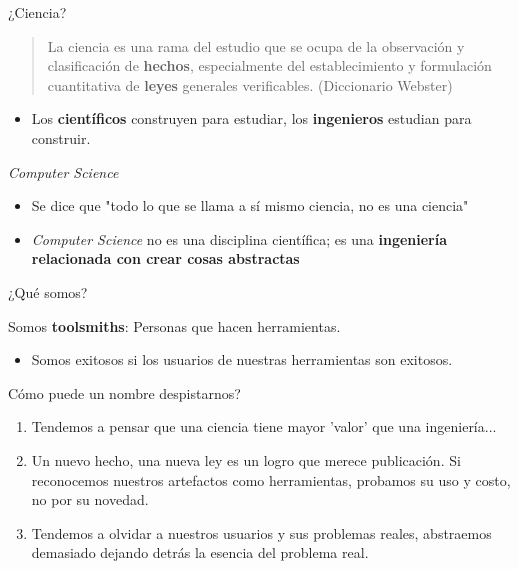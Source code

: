 \documentclass{beamer}
\begin{document}
\begin{frame}{¿Ciencia?}
\begin{quote}
La ciencia es una rama del estudio que se ocupa de la observación y
clasificación de \textbf{hechos}, especialmente del establecimiento y
formulación cuantitativa de \textbf{leyes} generales verificables.
\textnormal{(Diccionario Webster)}
\end{quote}
\begin{itemize}
\item Los \textbf{científicos} construyen para estudiar, los
	\textbf{ingenieros} estudian para construir.
\end{itemize}
\end{frame}

\begin{frame}{\emph{Computer Science}}
\begin{itemize}
\item Se dice que "todo lo que se llama a sí mismo ciencia, no es una ciencia"
\item \emph{Computer Science} no es una disciplina científica; es una
	\textbf{ingeniería relacionada con crear cosas abstractas}
\end{itemize}
\end{frame}

\begin{frame}{¿Qué somos?}
\begin{block}{}
	\begin{center}
	\LARGE Somos \textbf{toolsmiths}: Personas que hacen herramientas.
	\end{center}
\end{block}
\begin{itemize}
\item Somos exitosos si los usuarios de nuestras herramientas son exitosos.
\end{itemize}
\end{frame}


\begin{frame}{Cómo puede un nombre despistarnos?}
\begin{center}
\begin{enumerate}
\item Tendemos a pensar que una ciencia tiene mayor 'valor'
que una ingeniería...
\item Un nuevo hecho, una nueva ley es un logro que
merece publicación.
Si reconocemos nuestros artefactos como herramientas, 
probamos su uso y costo, no por su novedad.
\item Tendemos a olvidar a nuestros usuarios y sus problemas reales,
abstraemos demasiado dejando detrás la esencia del problema real.
\end{enumerate}
\end{center}
\end{frame}
\end{document}
